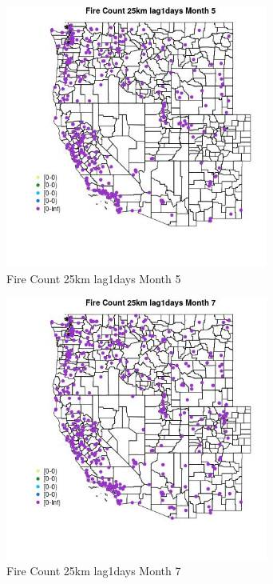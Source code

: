 \begin{figure} 
\centering  
\includegraphics[width=0.77\textwidth]{Code_Outputs/Report_ML_input_PM25_Step4_part_e_de_duplicated_aves_compiled_2019-05-18wNAs_MapObsMo5Fire_Count_25km_lag1days.jpg} 
\caption{\label{fig:Report_ML_input_PM25_Step4_part_e_de_duplicated_aves_compiled_2019-05-18wNAsMapObsMo5Fire_Count_25km_lag1days}Fire Count 25km lag1days Month 5} 
\end{figure} 
 

\begin{figure} 
\centering  
\includegraphics[width=0.77\textwidth]{Code_Outputs/Report_ML_input_PM25_Step4_part_e_de_duplicated_aves_compiled_2019-05-18wNAs_MapObsMo7Fire_Count_25km_lag1days.jpg} 
\caption{\label{fig:Report_ML_input_PM25_Step4_part_e_de_duplicated_aves_compiled_2019-05-18wNAsMapObsMo7Fire_Count_25km_lag1days}Fire Count 25km lag1days Month 7} 
\end{figure} 
 

